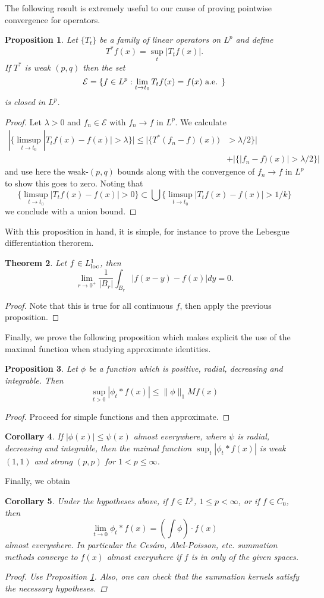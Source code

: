 \documentclass[11pt]{article}
\newtheorem{thm}{Theorem}
\newtheorem{prop}[thm]{Proposition}
\newtheorem{cor}[thm]{Corollary}
\theoremstyle{remark}
\newcommand{\calE}{\mathcal{E}}
\newcommand{\1}{\textbf{1}}
\def\norm#1{\| #1  \|}
\begin{document}
The following result is extremely useful to our cause of proving pointwise convergence for operators.
\begin{prop}
Let $\{T_t\}$ be a family of linear operators on $L^p$ and define
\[
T^* f(x) = \sup_t |T_t f(x)|.
\]
If $T^*$ is weak $(p,q)$ then the set
\[
\calE = \{f \in L^p : \lim_{t \to t_0} T_t f(x) = f(x) \textup{ a.e. }\}
\]
is closed in $L^p$.
\label{prop:closedconv}
\end{prop}
\begin{proof}
Let $\lambda > 0$ and $f_n \in \calE$ with $f_n \to f$ in $L^p$. We calculate
\begin{align*}
|\{ \limsup_{t \to t_0} |T_t f(x) - f(x)| > \lambda \}| \leq |\{ T^*(f_n - f)(x)) &> \lambda/2 \}| \\
& + |\{ |f_n - f)(x)| > \lambda/2\}|
\end{align*}
and use here the weak-$(p,q)$ bounds along with the convergence of $f_n \to f$ in $L^p$ to show this goes to zero. Noting that
\[
\{\limsup_{t \to t_0} |T_t f(x) - f(x)| > 0 \} \subset \bigcup \{\limsup_{t \to t_0} |T_t f(x) - f(x)| > 1/k \}
\]
we conclude with a union bound.
\end{proof}
With this proposition in hand, it is simple, for instance to prove the Lebesgue differentiation therorem.
\begin{thm}
Let $f \in L^1_{\textup{loc}}$, then
\[
\lim_{r \to 0^+} \frac{1}{|B_r|} \int_{B_r} |f(x-y) - f(x)| dy = 0.
\]
\end{thm}
\begin{proof}
Note that this is true for all continuous $f$, then apply the previous proposition.
\end{proof}
Finally, we prove the following proposition which makes explicit the use of the maximal function when studying approximate identities.
\begin{prop}
Let $\phi$ be a function which is positive, radial, decreasing and integrable. Then
\[
\sup_{t > 0} |\phi_t * f(x)| \leq \norm{\phi}_1 Mf(x)
\]
\end{prop}
\begin{proof}
Proceed for simple functions and then approximate.
\end{proof}
\begin{cor}
If $|\phi(x)| \leq \psi(x)$ almost everywhere, where $\psi$ is radial, decreasing and integrable, then the mzimal function $\sup_t|\phi_t * f(x)|$ is weak $(1,1)$ and strong $(p,p)$ for $1 < p \leq \infty$.
\end{cor}
Finally, we obtain
\begin{cor}
Under the hypotheses above, if $f \in L^p$, $1 \leq p < \infty$, or if $f \in C_0$, then
\[
\lim_{t \to 0} \phi_t * f(x) = \left( \int \phi \right) \cdot f(x)
\]
almost everywhere. In particular the Ces\'aro, Abel-Poisson, etc. summation methods converge to $f(x)$ almost everywhere if $f$ is in only of the given spaces.
\begin{proof}
Use Proposition \ref{prop:closedconv}. Also, one can check that the summation kernels satisfy the necessary hypotheses.
\end{proof}
\end{cor}
\end{document}
